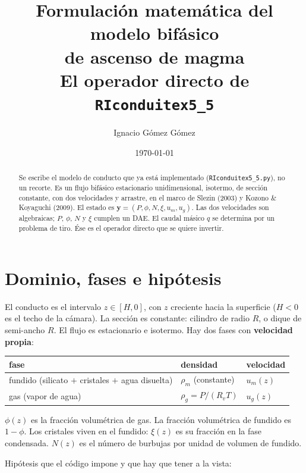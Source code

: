 \documentclass[11pt,a4paper]{article}
\title{\vspace{-1.4cm}\textbf{Formulación matemática del modelo bifásico\\ de ascenso de magma}\\[0.25em]
\large El operador directo de \texttt{RIconduitex5\_5}}
\author{Ignacio Gómez Gómez}
\date{\today}
\newcommand{\Rv}{R_v}
\begin{document}
\maketitle
\vspace{-0.9cm}

\begin{abstract}\noindent
Se escribe el modelo de conducto que ya está implementado
(\texttt{RIconduitex5\_5.py}), no un recorte. Es un flujo bifásico
estacionario unidimensional, isotermo, de sección constante, con dos
velocidades y arrastre, en el marco de Slezin (2003) y Kozono \&
Koyaguchi (2009). El estado es
$\mathbf{y}=(P,\phi,N,\xi,u_m,u_g)$. Las dos velocidades son
algebraicas; $P$, $\phi$, $N$ y $\xi$ cumplen un DAE. El caudal másico
$q$ se determina por un problema de tiro. Ése es el operador directo
que se quiere invertir.
\end{abstract}

\tableofcontents
\vspace{0.6em}

\section{Dominio, fases e hipótesis}

El conducto es el intervalo $z\in[H,0]$, con $z$ creciente hacia la
superficie ($H<0$ es el techo de la cámara). La sección es constante:
cilindro de radio $R$, o dique de semi-ancho $R$. El flujo es
estacionario e isotermo. Hay dos fases con \textbf{velocidad propia}:

\begin{center}
\begin{tabular}{@{}lll@{}}
\toprule
fase & densidad & velocidad \\
\midrule
fundido (silicato $+$ cristales $+$ agua disuelta) & $\rho_m$ (constante) & $u_m(z)$ \\
gas (vapor de agua) & $\rho_g=P/(\Rv T)$ & $u_g(z)$ \\
\bottomrule
\end{tabular}
\end{center}

$\phi(z)$ es la fracción volumétrica de gas. La fracción volumétrica
de fundido es $1-\phi$. Los cristales viven en el fundido: $\xi(z)$ es
su fracción en la fase condensada. $N(z)$ es el número de burbujas por
unidad de volumen de fundido.

Hipótesis que el código impone y que hay que tener a la vista:
\end{document}

